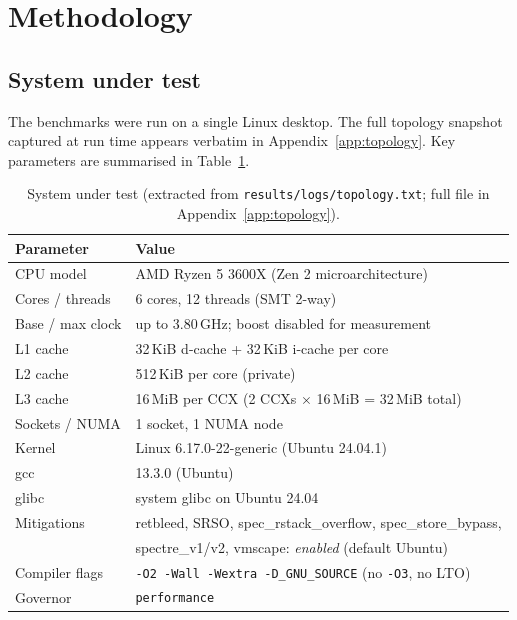 \documentclass[a4paper,11pt]{article}
\begin{document}
\section{Methodology}
\label{sec:method}

\subsection{System under test}
\label{sec:method:sut}

The benchmarks were run on a single Linux desktop. The full topology
snapshot captured at run time appears verbatim in
Appendix~\ref{app:topology}. Key parameters are summarised in
Table~\ref{tab:topology}.

\begin{table}[H]
\centering
\caption{System under test (extracted from \texttt{results/logs/topology.txt};
full file in Appendix~\ref{app:topology}).}
\label{tab:topology}
\begin{tabular}{ll}
\toprule
\textbf{Parameter} & \textbf{Value} \\
\midrule
CPU model            & AMD Ryzen 5 3600X (Zen 2 microarchitecture) \\
Cores / threads      & 6 cores, 12 threads (SMT 2-way) \\
Base / max clock     & up to 3.80\,GHz; boost disabled for measurement \\
L1 cache             & 32\,KiB d-cache + 32\,KiB i-cache per core \\
L2 cache             & 512\,KiB per core (private) \\
L3 cache             & 16\,MiB per CCX (2 CCXs $\times$ 16\,MiB = 32\,MiB total) \\
Sockets / NUMA       & 1 socket, 1 NUMA node \\
Kernel               & Linux 6.17.0-22-generic (Ubuntu 24.04.1) \\
gcc                  & 13.3.0 (Ubuntu) \\
glibc                & system glibc on Ubuntu 24.04 \\
Mitigations          & retbleed, SRSO, spec\_rstack\_overflow, spec\_store\_bypass, \\
                     & spectre\_v1/v2, vmscape: \emph{enabled} (default Ubuntu) \\
Compiler flags       & \texttt{-O2 -Wall -Wextra -D\_GNU\_SOURCE} (no \texttt{-O3}, no LTO) \\
Governor             & \texttt{performance} \\

\end{tabular}
\end{table}
\end{document}
